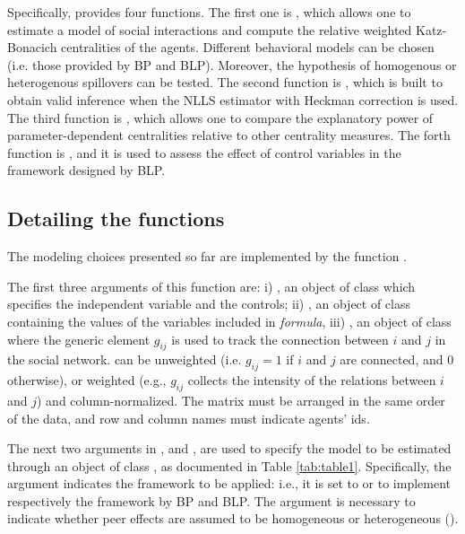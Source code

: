 \documentclass[nojss]{jss}
\begin{document}
Specifically,  provides four functions. The first one is , which allows one to estimate a model of social interactions and compute the relative weighted Katz-Bonacich centralities of the agents. Different behavioral models can be chosen (i.e. those provided by BP and BLP). Moreover, the hypothesis of homogenous or heterogenous spillovers can be tested. The second function is , which is built to obtain valid inference when the NLLS estimator with Heckman correction is used. The third function is , which allows one to compare the explanatory power of parameter-dependent centralities relative to other centrality measures. The forth function is , and it is used to assess the effect of control variables in the framework designed by BLP.

\subsection{Detailing the functions}
The modeling choices presented so far are implemented by the function .

The first three arguments of this function are: i) , an object of class  which specifies the independent variable and the controls; ii) , an object of class  containing the values of the variables included in \textit{formula}, iii) , an object of class  where the generic element $g_{ij}$ is used to track the connection between $i$ and $j$ in the social network.  can be unweighted (i.e. $g_{ij}=1$ if $i$ and $j$ are connected, and 0 otherwise), or weighted (e.g., $g_{ij}$ collects the intensity of the relations between $i$ and $j$) and column-normalized. The matrix must be arranged in the same order of the data, and row and column names must indicate agents' ids.

The next two arguments in ,  and 
, are used to specify the model to be estimated
through an object of class , as documented in Table \ref{tab:table1}. Specifically, the argument  indicates the framework to be applied: i.e., it is set to  or  to implement respectively the framework by BP and BLP. The argument  is necessary to indicate whether peer effects are assumed to be homogeneous  or heterogeneous (). 
\end{document}
